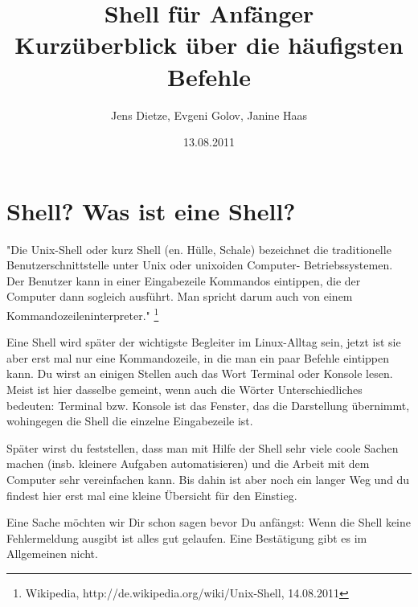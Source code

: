 \documentclass[a4paper,12pt]{article}
\title{Shell für Anfänger\\
\large{Kurzüberblick über die häufigsten Befehle}}
\author{Jens Dietze, Evgeni Golov, Janine Haas}
\date{13.08.2011}
\begin{document}
\maketitle

\tableofcontents
\pagebreak
\parindent 0pt
\parskip 10pt
\section{Shell? Was ist eine Shell?}
"Die Unix-Shell oder kurz Shell (en. Hülle, Schale) bezeichnet die 
traditionelle Benutzerschnittstelle unter Unix oder unixoiden Computer-
Betriebssystemen. Der Benutzer kann in einer Eingabezeile Kommandos 
eintippen, die der Computer dann sogleich ausführt. Man spricht darum 
auch von einem Kommandozeileninterpreter."
\footnote{Wikipedia, http://de.wikipedia.org/wiki/Unix-Shell, 14.08.2011}

Eine Shell wird später der wichtigste Begleiter im Linux-Alltag sein, 
jetzt ist sie aber erst mal nur eine Kommandozeile, in die man ein paar 
Befehle eintippen kann. Du wirst an einigen Stellen auch das Wort 
Terminal oder Konsole lesen. Meist ist hier dasselbe gemeint, wenn 
auch die Wörter Unterschiedliches bedeuten: Terminal bzw. Konsole ist 
das Fenster, das die Darstellung übernimmt, wohingegen die Shell die 
einzelne Eingabezeile ist.

Später wirst du feststellen, dass man mit Hilfe der Shell sehr viele 
coole Sachen machen (insb. kleinere Aufgaben automatisieren) und die 
Arbeit mit dem Computer sehr vereinfachen kann. Bis dahin ist aber noch 
ein langer Weg und du findest hier erst mal eine kleine Übersicht für 
den Einstieg.

Eine Sache möchten wir Dir schon sagen bevor Du anfängst: Wenn die Shell keine Fehlermeldung ausgibt ist alles gut gelaufen. Eine Bestätigung gibt es im Allgemeinen nicht.
\end{document}
